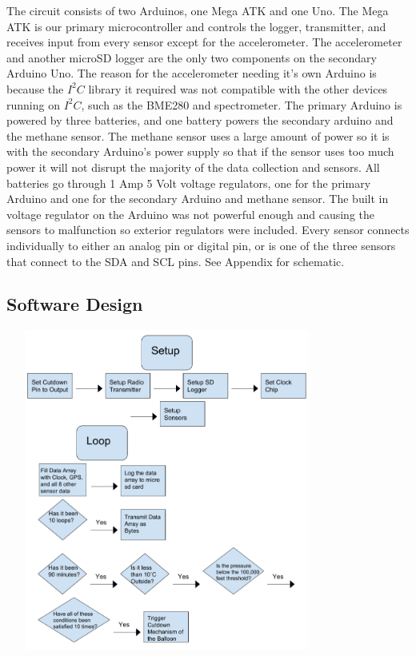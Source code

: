 \documentclass[12pt,]{article}
\begin{document}
The circuit consists of two Arduinos, one Mega ATK and one Uno. The Mega
ATK is our primary microcontroller and controls the logger, transmitter,
and receives input from every sensor except for the accelerometer. The
accelerometer and another microSD logger are the only two components on
the secondary Arduino Uno. The reason for the accelerometer needing it's
own Arduino is because the \(I^2C\) library it required was not
compatible with the other devices running on \(I^2C\), such as the
BME280 and spectrometer. The primary Arduino is powered by three
batteries, and one battery powers the secondary arduino and the methane
sensor. The methane sensor uses a large amount of power so it is with
the secondary Arduino's power supply so that if the sensor uses too much
power it will not disrupt the majority of the data collection and
sensors. All batteries go through 1 Amp 5 Volt voltage regulators, one
for the primary Arduino and one for the secondary Arduino and methane
sensor. The built in voltage regulator on the Arduino was not powerful
enough and causing the sensors to malfunction so exterior regulators
were included. Every sensor connects individually to either an analog
pin or digital pin, or is one of the three sensors that connect to the
SDA and SCL pins. See Appendix for schematic.

\subsection{Software Design}\label{software-design}

\begin{center}\includegraphics[width=400px,height=400px]{assets/flow_code} \end{center}
\end{document}
